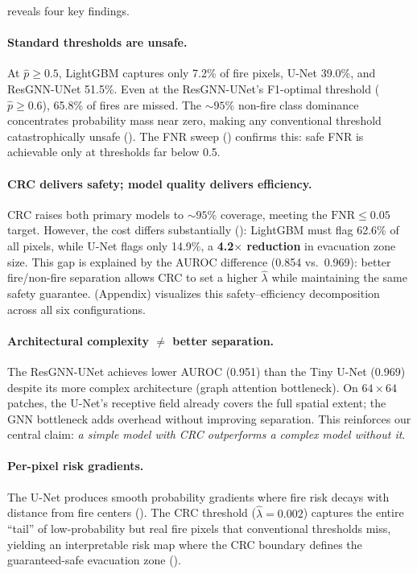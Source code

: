 \documentclass{article}
\begin{document}
 reveals four key findings.

\paragraph{Standard thresholds are unsafe.}
At $\hat{p} \ge 0.5$, LightGBM captures only 7.2\% of fire pixels, U-Net 39.0\%, and ResGNN-UNet 51.5\%.
Even at the ResGNN-UNet's F1-optimal threshold ($\hat{p} \ge 0.6$), 65.8\% of fires are missed.
The ${\sim}95\%$ non-fire class dominance concentrates probability mass near zero, making any conventional threshold catastrophically unsafe ().
The FNR sweep () confirms this: safe FNR is achievable only at thresholds far below 0.5.

\paragraph{CRC delivers safety; model quality delivers efficiency.}
CRC raises both primary models to ${\sim}95\%$ coverage, meeting the $\mathrm{FNR} \le 0.05$ target.
However, the cost differs substantially ():
LightGBM must flag 62.6\% of all pixels, while U-Net flags only 14.9\%, a \textbf{4.2$\times$ reduction} in evacuation zone size.
This gap is explained by the AUROC difference (0.854 vs.\ 0.969): better fire/non-fire separation allows CRC to set a higher $\hat{\lambda}$ while maintaining the same safety guarantee.
 (Appendix) visualizes this safety--efficiency decomposition across all six configurations.

\paragraph{Architectural complexity $\ne$ better separation.}
The ResGNN-UNet achieves lower AUROC (0.951) than the Tiny U-Net (0.969) despite its more complex architecture (graph attention bottleneck).
On $64{\times}64$ patches, the U-Net's receptive field already covers the full spatial extent; the GNN bottleneck adds overhead without improving separation.
This reinforces our central claim: \emph{a simple model with CRC outperforms a complex model without it}.

\paragraph{Per-pixel risk gradients.}
The U-Net produces smooth probability gradients where fire risk decays with distance from fire centers ().
The CRC threshold ($\hat{\lambda} = 0.002$) captures the entire ``tail'' of low-probability but real fire pixels that conventional thresholds miss, yielding an interpretable risk map where the CRC boundary defines the guaranteed-safe evacuation zone ().
\end{document}

